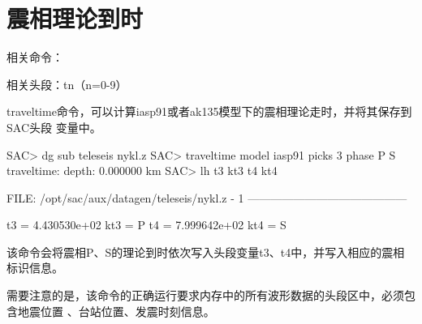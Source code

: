 \section{震相理论到时}
相关命令：

相关头段：tn（n=0-9）

traveltime命令，可以计算iasp91或者ak135模型下的震相理论走时，并将其保存到SAC头段
变量中。

\begin{SACCode}
SAC> dg sub teleseis nykl.z
SAC> traveltime model iasp91 picks 3 phase P S 
traveltime: depth: 0.000000 km
SAC> lh t3 kt3 t4 kt4
  
  FILE: /opt/sac/aux/datagen/teleseis/nykl.z - 1
   ------------------------------------------

         t3 = 4.430530e+02
        kt3 = P
         t4 = 7.999642e+02
        kt4 = S
\end{SACCode}

该命令会将震相P、S的理论到时依次写入头段变量t3、t4中，并写入相应的震相标识信息。

需要注意的是，该命令的正确运行要求内存中的所有波形数据的头段区中，必须包含地震位置
、台站位置、发震时刻信息。
